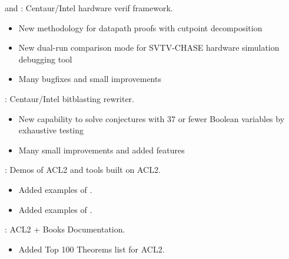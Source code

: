 \begin{frame}

\implibtitle

 and :
Centaur/Intel hardware verif framework.
\begin{itemize}
\item New methodology for datapath proofs with cutpoint decomposition
\item New dual-run comparison mode for SVTV-CHASE hardware simulation debugging tool
\item Many bugfixes and small improvements
\end{itemize}

:
Centaur/Intel bitblasting rewriter.
\begin{itemize}
\item New capability to solve conjectures with 37 or fewer Boolean variables by exhaustive testing
\item Many small improvements and added features
\end{itemize}

\end{frame}


\begin{frame}

\implibtitle

:
Demos of ACL2 and tools built on ACL2.
\begin{itemize}
\item Added examples of .
\item Added examples of .
\end{itemize}
\end{frame}


\begin{frame}

\implibtitle

:
ACL2 + Books Documentation.
\begin{itemize}
\item Added Top 100 Theorems list for ACL2.
\end{itemize}
\end{frame}


